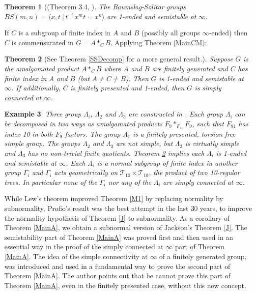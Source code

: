 \documentclass[12pt]{article}
\newtheorem{theorem}{Theorem}[subsection]
\newtheorem{example}[theorem]{Example}
\begin{document}
\begin{theorem} [(Theorem 3.4, \cite{M1}] \label{BSmn}
The Baumslag-Solitar groups $BS(m,n)=\langle x,t  \ |\  t^{-1} x^mt=x^n\rangle$ are 1-ended and semistable at $\infty$.
\end{theorem}

If $C$ is a subgroup of finite index in $A$ and $B$ (possibly all groups $\infty$-ended) then $C$ is commensurated in $G=A\ast_C B$. Applying Theorem \ref{MainCM}:

 \begin{theorem} [See Theorem \ref{SSDecomp} for a more general result.] \label{FIss} 
 Suppose $G$ is the amalgamated product $A\ast_CB$ where $A$ and $B$ are finitely generated and $C$ has finite index in $A$ and $B$ (but $A\ne C\ne B$). Then $G$ is 1-ended and semistable at $\infty$. If additionally, $C$ is finitely presented and 1-ended, then $G$ is simply connected at $\infty$. 
 \end{theorem} 
 
\begin{example} \label{Examples3}  Three group $\Lambda_i$, $\Lambda_2$ and $\Lambda_3$ are constructed in \cite{Ratt07}. Each group $\Lambda_i$ can be decomposed in two ways as amalgamated products $F_9\ast_{F_{81}} F_9$, such that $F_{81}$ has index 10 in both $F_9$ factors. The group $\Lambda_1$ is a finitely presented, torsion free simple group. The groups $\Lambda_2$ and $\Lambda_3$ are not simple, but $\Lambda_2$ is virtually simple and $\Lambda_3$ has no non-trivial finite quotients.
Theorem \ref{FIss} implies each $\Lambda_i$ is 1-ended and semistable at $\infty$. Each $\Lambda_i$ is a normal subgroup of finite index in another group $\Gamma_i$ and $\Gamma_i$ acts geometrically on $\mathcal T_{10}\times \mathcal T_{10}$, the product of two 10-regular trees. In particular none of the $\Gamma_i$ nor any of the $\Lambda_i$ are simply connected at $\infty$. 
\end{example}

While Lew's theorem improved Theorem \ref{M1} by replacing normality by subnormality, Profio's result was the best attempt  in the last 30 years, to improve the normality hypothesis of Theorem \ref{J} to subnormality. As a corollary of Theorem \ref{MainA}, we obtain a subnormal version of Jackson's Theorem \ref{J}. The semistability part of Theorem \ref{MainA} was proved first and then used in an essential way in the proof of the simply connected at $\infty$ part of Theorem \ref{MainA}. The idea of the simple connectivity at $\infty$ of a finitely generated group, was introduced and used in a fundamental way to prove the second part of Theorem \ref{MainA}.  The author points out that he cannot prove this part of Theorem \ref{MainA}, even in the finitely presented case, without this new concept. 
\end{document}
